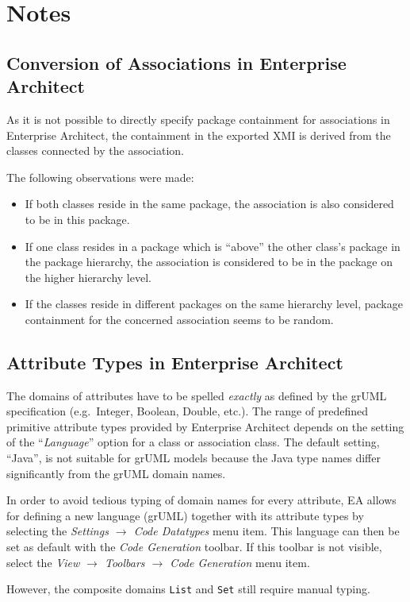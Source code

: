 \documentclass[a4paper]{article}
\begin{document}
	\section{Notes}
	\subsection{Conversion of Associations in Enterprise Architect}
	As it is not possible to directly specify package containment for associations in Enterprise Architect, the containment in the exported XMI is derived from the classes connected by the association.

	The following observations were made:
	\begin{itemize}
		\item If both classes reside in the same package, the association is also considered to be in this package.
		\item If one class resides in a package which is ``above'' the other class's package in the package hierarchy, the association is considered to be in the package on the higher hierarchy level.
		\item If the classes reside in different packages on the same hierarchy level, package containment for the concerned association seems to be random.
	\end{itemize}
	
	\subsection{Attribute Types in Enterprise Architect}
	The domains of attributes have to be spelled \emph{exactly} as defined by the grUML specification (e.g.\ Integer, Boolean, Double, etc.). The range of predefined primitive attribute types provided by Enterprise Architect depends on the setting of the ``\emph{Language}'' option for a class or association class. The default setting, ``Java'', is not suitable for grUML models because the Java type names differ significantly from the grUML domain names. 

	In order to avoid tedious typing of domain names for every attribute, EA allows for defining a new language (grUML) together with its attribute types by selecting the \emph{Settings $\rightarrow$ Code Datatypes} menu item. This language can then be set as default with the \emph{Code Generation} toolbar. If this toolbar is not visible, select the \emph{View $\rightarrow$ Toolbars $\rightarrow$ Code Generation} menu item.
	
	However, the composite domains \texttt{List} and \texttt{Set} still require manual typing.
	
\end{document}
